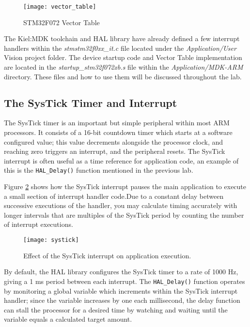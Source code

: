 \documentclass[openany,11pt,fleqn]{book} %
\begin{document}
\begin{figure}[]
    \centering\texttt{[image: vector\_table]}
    \caption{STM32F072 Vector Table}
    \label{vector_table}
\end{figure}


The Kiel:MDK toolchain and HAL library have already defined a few interrupt handlers within the \textit{stmstm32f0xx\_it.c} file located under the \textit{Application/User} {\textmu}Vision project folder. The device startup code and Vector Table implementation are located in the \textit{startup\_stm32f072xb.s} file within the \textit{Application/MDK-ARM} directory. These files and how to use them will be discussed throughout the lab.


\subsection{The SysTick Timer and Interrupt}
The SysTick timer is an important but simple peripheral within most ARM processors. It consists of a 16-bit countdown timer which starts at a software configured value; this value decrements alongside the processor clock, and reaching zero triggers an interrupt, and the peripheral resets. The SysTick interrupt is often useful as a time reference for application code, an example of this is the \texttt{HAL\_Delay()} function mentioned in the previous lab. 

Figure \ref{systick} shows how the SysTick interrupt pauses the main application to execute a small section of interrupt handler code.Due to a constant delay between successive executions of the handler, you may calculate timing accurately with longer intervals that are multiples of the SysTick period by counting the number of interrupt executions.  

\begin{figure}[h]
    \centering\texttt{[image: systick]}
    \caption{Effect of the SysTick interrupt on application execution.}
    \label{systick}
\end{figure}

By default, the HAL library configures the SysTick timer to a rate of 1000 Hz, giving a 1 ms period between each interrupt. The \texttt{HAL\_Delay()} function operates by monitoring a global variable which increments within the SysTick interrupt handler; since the variable increases by one each millisecond, the delay function can stall the processor for a desired time by watching and waiting until the variable equals a calculated target amount. 
\end{document}
